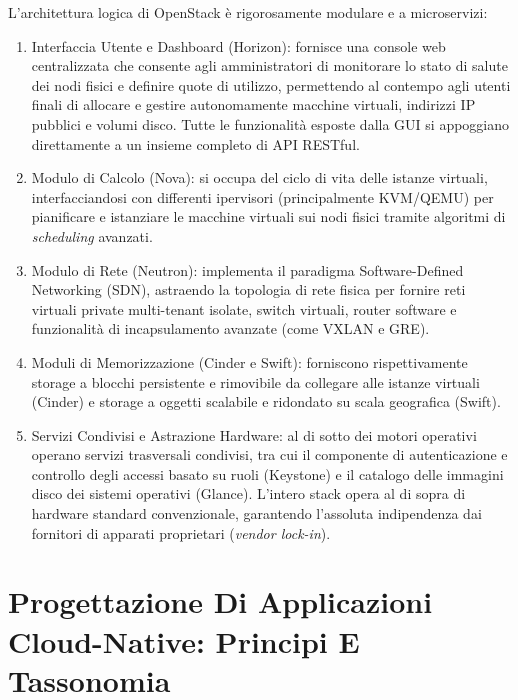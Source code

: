 \documentclass[11pt, a4paper]{article}
\begin{document}

L'architettura logica di OpenStack è rigorosamente modulare e a microservizi:
\begin{enumerate}[noitemsep]
    \item Interfaccia Utente e Dashboard (Horizon): fornisce una console web centralizzata che consente agli amministratori di monitorare lo stato di salute dei nodi fisici e definire quote di utilizzo, permettendo al contempo agli utenti finali di allocare e gestire autonomamente macchine virtuali, indirizzi IP pubblici e volumi disco. Tutte le funzionalità esposte dalla GUI si appoggiano direttamente a un insieme completo di API RESTful.
    \item Modulo di Calcolo (Nova): si occupa del ciclo di vita delle istanze virtuali, interfacciandosi con differenti ipervisori (principalmente KVM/QEMU) per pianificare e istanziare le macchine virtuali sui nodi fisici tramite algoritmi di \emph{scheduling} avanzati.
    \item Modulo di Rete (Neutron): implementa il paradigma Software-Defined Networking (SDN), astraendo la topologia di rete fisica per fornire reti virtuali private multi-tenant isolate, switch virtuali, router software e funzionalità di incapsulamento avanzate (come VXLAN e GRE).
    \item Moduli di Memorizzazione (Cinder e Swift): forniscono rispettivamente storage a blocchi persistente e rimovibile da collegare alle istanze virtuali (Cinder) e storage a oggetti scalabile e ridondato su scala geografica (Swift).
    \item Servizi Condivisi e Astrazione Hardware: al di sotto dei motori operativi operano servizi trasversali condivisi, tra cui il componente di autenticazione e controllo degli accessi basato su ruoli (Keystone) e il catalogo delle immagini disco dei sistemi operativi (Glance). L'intero stack opera al di sopra di hardware standard convenzionale, garantendo l'assoluta indipendenza dai fornitori di apparati proprietari (\emph{vendor lock-in}).
\end{enumerate}

\newpage

\section{Progettazione Di Applicazioni Cloud-Native: Principi E Tassonomia}
\end{document}
